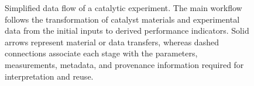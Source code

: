 \begin{figure}[H]
{%
    }
    \caption{Simplified data flow of a catalytic experiment. The main
    workflow follows the transformation of catalyst materials and experimental
    data from the initial inputs to derived performance indicators. Solid
    arrows represent material or data transfers, whereas dashed connections
    associate each stage with the parameters, measurements, metadata, and
    provenance information required for interpretation and reuse.}
    \label{fig:catalysis-data-flow}
\end{figure}